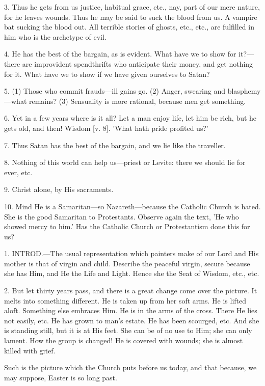3. Thus he gets from us justice, habitual grace,
etc., nay, part of our mere nature, for he leaves wounds. Thus he may
be said to suck the blood from us. A vampire bat sucking the blood
out. All terrible stories of ghosts, etc., etc., are fulfilled in him
who is the archetype of evil.

4. He has the best of the bargain, as is evident.
What have we to show for it?—there are improvident spendthrifts who
anticipate their money, and get nothing for it. What have we to show
if we have given ourselves to Satan?

5. (1) Those who commit frauds—ill gains go.
(2) Anger, swearing and blasphemy—what remains? (3) Sensuality is
more rational, because men get something.

6. Yet in a few years where is it all? Let a man
enjoy life, let him be rich, but he gets old, and then! Wisdom
[v. 8]. 'What hath pride profited us?'

7. Thus Satan has the best of the bargain, and we
lie like the traveller.

8. Nothing of this world can help us—priest or
Levite: there we should lie for ever, etc.

9. Christ alone, by His sacraments.

10. Mind He is a Samaritan—so
Nazareth—because the Catholic Church is hated. She is the good
Samaritan to Protestants. Observe again the text, 'He who showed mercy
to him.' Has the Catholic Church or Protestantism done this for us?


1. INTROD.—The
usual representation which painters make of our Lord and His mother is
that of virgin and child. Describe the peaceful virgin, secure because
she has Him, and He the Life and Light. Hence she the Seat of Wisdom,
etc., etc.

2. But let thirty years pass, and there is a
great change come over the picture. It melts into something different.
He is taken up from her soft arms. He is lifted aloft. Something else
embraces Him. He is in the arms of the cross. There He lies not
easily, etc. He has grown to man's estate. He has been scourged, etc.
And she is standing still, but it is at His feet. She can be of no use
to Him; she can only lament. How the group is changed! He is
covered with wounds; she is almost killed with grief.

Such is the picture which the Church puts before
us today, and that because, we may suppose, Easter is so long past.

